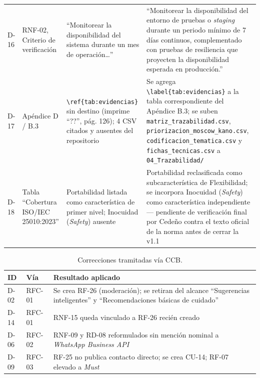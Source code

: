 \documentclass[journal,onecolumn]{IEEEtran}
\begin{document}
\begin{table}[H]
\begin{tabularx}{\textwidth}{@{}l l X X@{}}
			\addlinespace
			D-16 & RNF-02, Criterio de verificación & ``Monitorear la disponibilidad del sistema durante un mes de operación\ldots{}'' & ``Monitorear la disponibilidad del entorno de pruebas o \emph{staging} durante un periodo mínimo de 7 días continuos, complementado con pruebas de resiliencia que proyecten la disponibilidad esperada en producción.'' \\
			\addlinespace
			D-17 & Apéndice D / B.3 & \texttt{\textbackslash ref\{tab:evidencias\}} sin destino (imprime ``??'', pág. 126); 4 CSV citados y ausentes del repositorio & Se agrega \texttt{\textbackslash label\{tab:evidencias\}} a la tabla correspondiente del Apéndice B.3; se suben \texttt{matriz\_trazabilidad.csv}, \texttt{priorizacion\_moscow\_kano.csv}, \texttt{codificacion\_tematica.csv} y \texttt{fichas\_tecnicas.csv} a \texttt{04\_Trazabilidad/} \\
			\addlinespace
			D-18 & Tabla ``Cobertura ISO/IEC 25010:2023'' & Portabilidad listada como característica de primer nivel; Inocuidad (\emph{Safety}) ausente & Portabilidad reclasificada como subcaracterística de Flexibilidad; se incorpora Inocuidad (\emph{Safety}) como característica independiente --- pendiente de verificación final por Cedeño contra el texto oficial de la norma antes de cerrar la v1.1 \\
			\bottomrule
		\end{tabularx}
	\end{table}
	
	\begin{table}[H]
		\centering
		\caption{Correcciones tramitadas vía CCB.}
		\label{tab:correcciones-ccb}
		\small
		\begin{tabularx}{\textwidth}{@{}l l X@{}}
			\toprule
			\textbf{ID} & \textbf{Vía} & \textbf{Resultado aplicado} \\
			\midrule
			D-02 & RFC-01 & Se crea RF-26 (moderación); se retiran del alcance ``Sugerencias inteligentes'' y ``Recomendaciones básicas de cuidado'' \\
			D-14 & RFC-01 & RNF-15 queda vinculado a RF-26 recién creado \\
			D-06 & RFC-02 & RNF-09 y RD-08 reformulados sin mención nominal a \emph{WhatsApp Business API} \\
			D-09 & RFC-03 & RF-25 no publica contacto directo; se crea CU-14; RF-07 elevado a \emph{Must} \\
			\bottomrule
		\end{tabularx}
	\end{table}
	
\end{document}
